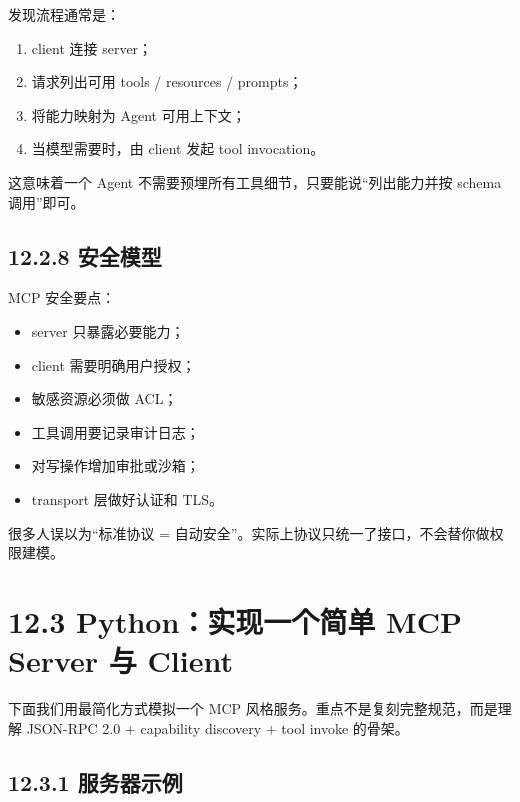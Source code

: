 发现流程通常是：


\begin{enumerate}[leftmargin=2em]
\item client 连接 server；
\item 请求列出可用 tools / resources / prompts；
\item 将能力映射为 Agent 可用上下文；
\item 当模型需要时，由 client 发起 tool invocation。
\end{enumerate}

这意味着一个 Agent 不需要预埋所有工具细节，只要能说``列出能力并按 schema 调用''即可。


\subsection{12.2.8 安全模型}

MCP 安全要点：


\begin{itemize}[leftmargin=2em]
\item server 只暴露必要能力；
\item client 需要明确用户授权；
\item 敏感资源必须做 ACL；
\item 工具调用要记录审计日志；
\item 对写操作增加审批或沙箱；
\item transport 层做好认证和 TLS。
\end{itemize}

很多人误以为``标准协议 = 自动安全''。实际上协议只统一了接口，不会替你做权限建模。


\section{12.3 Python：实现一个简单 MCP Server 与 Client}

下面我们用最简化方式模拟一个 MCP 风格服务。重点不是复刻完整规范，而是理解 JSON-RPC 2.0 + capability discovery + tool invoke 的骨架。


\subsection{12.3.1 服务器示例}

